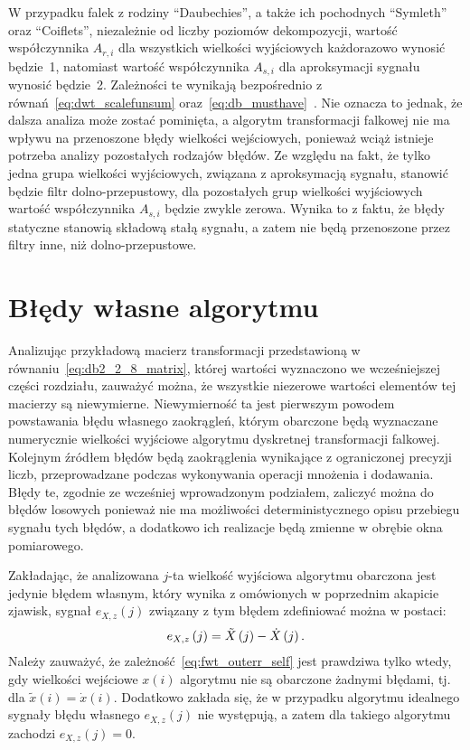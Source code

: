 W przypadku falek z rodziny \enquote{Daubechies}, a także ich pochodnych \enquote{Symleth} oraz \enquote{Coiflets}, niezależnie od liczby poziomów dekompozycji, wartość współczynnika $A_{r,i}$ dla wszystkich wielkości wyjściowych każdorazowo wynosić będzie~\num{1}, natomiast wartość współczynnika $A_{s,i}$ dla aproksymacji sygnału wynosić będzie~\num{2}. Zależności te wynikają bezpośrednio z równań~\eqref{eq:dwt_scalefunsum} oraz~\eqref{eq:db_musthave}~\cite{vonesch_dbbasics, wei_coiflet}. Nie oznacza to jednak, że dalsza analiza może zostać pominięta, a algorytm transformacji falkowej nie ma wpływu na przenoszone błędy wielkości wejściowych, ponieważ wciąż istnieje potrzeba analizy pozostałych rodzajów błędów. Ze względu na fakt, że tylko jedna grupa wielkości wyjściowych, związana z aproksymacją sygnału, stanowić będzie filtr dolno-przepustowy, dla pozostałych grup wielkości wyjściowych wartość współczynnika $A_{s,i}$ będzie zwykle zerowa. Wynika to z faktu, że błędy statyczne stanowią składową stałą sygnału, a zatem nie będą przenoszone przez filtry inne, niż dolno-przepustowe.

\section{Błędy własne algorytmu}

Analizując przykładową macierz transformacji przedstawioną w równaniu~\eqref{eq:db2_2_8_matrix}, której wartości wyznaczono we wcześniejszej części rozdziału, zauważyć można, że wszystkie niezerowe wartości elementów tej macierzy są niewymierne. Niewymierność ta jest pierwszym powodem powstawania błędu własnego zaokrągleń, którym obarczone będą wyznaczane numerycznie wielkości wyjściowe algorytmu dyskretnej transformacji falkowej. Kolejnym źródłem błędów będą zaokrąglenia wynikające z ograniczonej precyzji liczb, przeprowadzane podczas wykonywania operacji mnożenia i dodawania. Błędy te, zgodnie ze wcześniej wprowadzonym podziałem, zaliczyć można do błędów losowych ponieważ nie ma możliwości deterministycznego opisu przebiegu sygnału tych błędów, a dodatkowo ich realizacje będą zmienne w obrębie okna pomiarowego.

Zakładając, że analizowana $j$-ta wielkość wyjściowa algorytmu obarczona jest jedynie błędem własnym, który wynika z omówionych w poprzednim akapicie zjawisk, sygnał $e_{X,z}(j)$ związany z tym błędem zdefiniować można w postaci:
\begin{equation}
e_{X,z} \left(j\right) = \tilde{X} \left(j\right) - \dot{X} \left(j\right) \label{eq:fwt_outerr_self}.
\end{equation}
Należy zauważyć, że zależność~\eqref{eq:fwt_outerr_self} jest prawdziwa tylko wtedy, gdy wielkości wejściowe $x(i)$ algorytmu nie są obarczone żadnymi błędami, tj. dla $\tilde{x}(i) = \dot{x}(i)$. Dodatkowo zakłada się, że w przypadku algorytmu idealnego sygnały błędu własnego $e_{X,z}(j)$ nie występują, a zatem dla takiego algorytmu zachodzi $e_{X,z}(j) = 0$.

